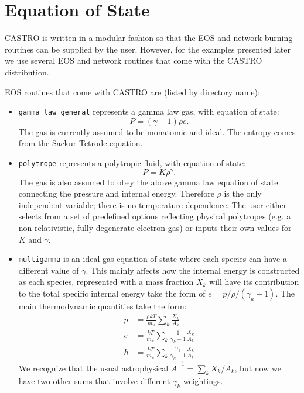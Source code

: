 \section{Equation of State}
CASTRO is written in a modular fashion so that the EOS and network
burning routines can be supplied by the user.   However, for the
examples presented later we use several EOS and network routines
that come with the CASTRO distribution.  

EOS routines that come with CASTRO are (listed by directory name):
\begin{itemize}

\item {\tt gamma\_law\_general} represents a gamma law gas, with equation of state:
\begin{equation}
  P = (\gamma - 1) \rho e.
\end{equation}
The gas is currently assumed to be monatomic and ideal. The entropy comes from the Sackur-Tetrode equation.

\item {\tt polytrope} represents a polytropic fluid, with equation of state:
\begin{equation}
  P = K \rho^\gamma.
\end{equation}
The gas is also assumed to obey the above gamma law equation of state
connecting the pressure and internal energy. Therefore $\rho$ is the
only independent variable; there is no temperature dependence. The
user either selects from a set of predefined options reflecting
physical polytropes (e.g. a non-relativistic, fully degenerate
electron gas) or inputs their own values for $K$ and $\gamma$.

\item {\tt multigamma} is an ideal gas equation of state where each
  species can have a different value of $\gamma$.  This mainly affects
  how the internal energy is constructed as each species, represented
  with a mass fraction $X_k$ will have its contribution to the total
  specific internal energy take the form of $e = p/\rho/(\gamma_k -
  1)$.  The main thermodynamic quantities take the form:
\begin{align}
p &= \frac{\rho k T}{m_u} \sum_k \frac{X_k}{A_k} \\
e &= \frac{k T}{m_u} \sum_k \frac{1}{\gamma_k - 1} \frac{X_k}{A_k} \\
h &= \frac{k T}{m_u} \sum_k \frac{\gamma_k}{\gamma_k - 1} \frac{X_k}{A_k}
\end{align}
We recognize that the usual astrophysical $\bar{A}^{-1} = \sum_k
X_k/A_k$, but now we have two other sums that involve different
$\gamma_k$ weightings.


\end{itemize}
